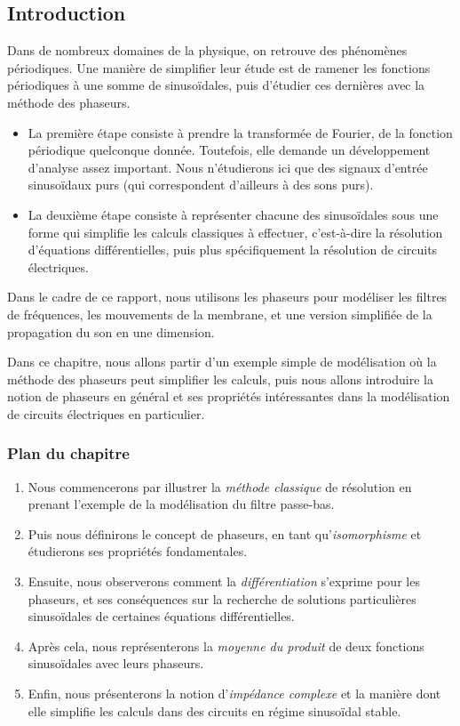 \subsection*{Introduction}

Dans de nombreux domaines de la physique,
on retrouve des phénomènes périodiques.
Une manière de simplifier leur étude
est de ramener les fonctions périodiques à une somme de sinusoïdales,
puis d'étudier ces dernières avec la méthode des phaseurs.
\begin{itemize}
    \item La première étape consiste à prendre la transformée de Fourier,
        de la fonction périodique quelconque donnée.
        Toutefois, elle demande un développement d'analyse assez important.
        Nous n'étudierons ici que des signaux d'entrée sinusoïdaux purs
        (qui correspondent d'ailleurs à des sons purs).
    \item La deuxième étape consiste à représenter chacune des sinusoïdales
        sous une forme qui simplifie les calculs classiques à effectuer,
        c'est-à-dire la résolution d'équations différentielles,
        puis plus spécifiquement la résolution de circuits électriques.
\end{itemize}

Dans le cadre de ce rapport,
nous utilisons les phaseurs pour modéliser les filtres de fréquences,
les mouvements de la membrane,
et une version simplifiée de la propagation du son en une dimension.

Dans ce chapitre, nous allons partir d'un exemple simple de modélisation
où la méthode des phaseurs peut simplifier les calculs,
puis nous allons introduire la notion de phaseurs
en général et ses propriétés
intéressantes dans la modélisation de circuits électriques en particulier.

\subsubsection*{Plan du chapitre}
\begin{enumerate}
    \item Nous commencerons par illustrer la \emph{méthode classique}
        de résolution en prenant l'exemple de la modélisation
        du filtre passe-bas.
    \item Puis nous définirons le concept de phaseurs, 
        en tant qu'\emph{isomorphisme} et étudierons
        ses propriétés fondamentales.
    \item Ensuite, nous observerons comment la \emph{différentiation}
        s'exprime pour les phaseurs, et ses conséquences sur
        la recherche de solutions particulières sinusoïdales
        de certaines équations différentielles.
    \item Après cela, nous représenterons la \emph{moyenne du produit}
        de deux fonctions sinusoïdales avec leurs phaseurs.
    \item Enfin, nous présenterons la notion d'\emph{impédance complexe}
        et la manière dont elle simplifie les calculs
        dans des circuits en régime sinusoïdal stable.
\end{enumerate}
